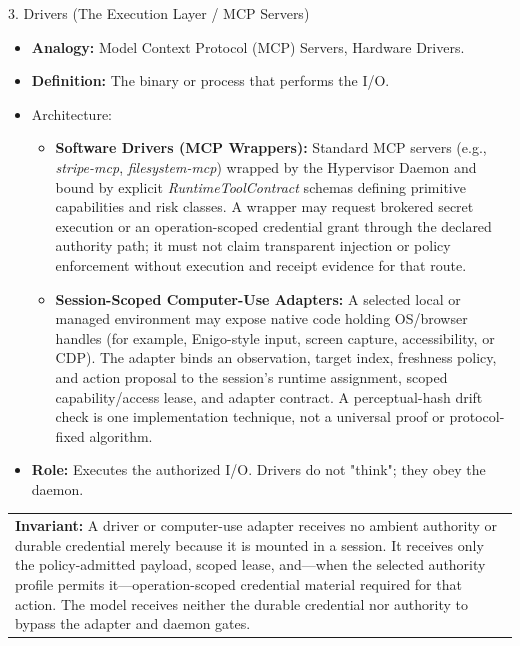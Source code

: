 \documentclass[
  11pt,
]{article}
\providecommand{\tightlist}{%
  \setlength{\itemsep}{0pt}\setlength{\parskip}{0pt}}
\begin{document}
3. Drivers (The Execution Layer / MCP Servers)

\begin{itemize}
\item
  \textbf{Analogy:} Model Context Protocol (MCP) Servers, Hardware
  Drivers.
\item
  \textbf{Definition:} The binary or process that performs the I/O.
\item
  Architecture:

  \begin{itemize}
  \tightlist
  \item
    \textbf{Software Drivers (MCP Wrappers):} Standard MCP servers
    (e.g., \emph{stripe-mcp}, \emph{filesystem-mcp}) wrapped by the
    Hypervisor Daemon and bound by explicit \emph{RuntimeToolContract} schemas
    defining primitive capabilities and risk classes. A wrapper may request
    brokered secret execution or an operation-scoped credential grant through
    the declared authority path; it must not claim transparent injection or
    policy enforcement without execution and receipt evidence for that route.
  \item
    \textbf{Session-Scoped Computer-Use Adapters:} A selected local or managed
    environment may expose native code holding OS/browser handles (for example,
    Enigo-style input, screen capture, accessibility, or CDP). The adapter binds
    an observation, target index, freshness policy, and action proposal to the
    session's runtime assignment, scoped capability/access lease, and adapter
    contract. A perceptual-hash
    drift check is one implementation technique, not a universal proof or
    protocol-fixed algorithm.
  \end{itemize}
\item
  \textbf{Role:} Executes the authorized I/O. Drivers do not "think";
  they obey the daemon.
\end{itemize}

\begin{longtable}[]{@{}>{\raggedright\arraybackslash}p{\linewidth}@{}}
\toprule\noalign{}
 \\
\midrule\noalign{}
\endhead
\bottomrule\noalign{}
\endlastfoot
\textbf{Invariant:}\emph{\textbf{ }}A driver or computer-use adapter receives
no ambient authority or durable credential merely because it is mounted in a
session. It receives only the policy-admitted payload, scoped lease, and---when
the selected authority profile permits it---operation-scoped credential
material required for that action. The model receives neither the durable
credential nor authority to bypass the adapter and daemon gates. \\
\end{longtable}
\end{document}
